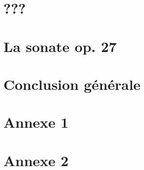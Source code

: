 \documentclass[]{music}
\begin{document}




\newpage
\strut\thispagestyle{empty}
\newpage



\newpage
\strut\thispagestyle{empty}
\newpage

\newpage
\strut\thispagestyle{empty}
\newpage
\tableofcontents
\newpage
\strut\thispagestyle{empty}
\newpage


\part{???}




\part{La sonate op. 27}




\part{Conclusion générale}




\part*{Annexe 1}




\part*{Annexe 2}




\newpage
\strut\thispagestyle{empty}
\newpage





\end{document}
